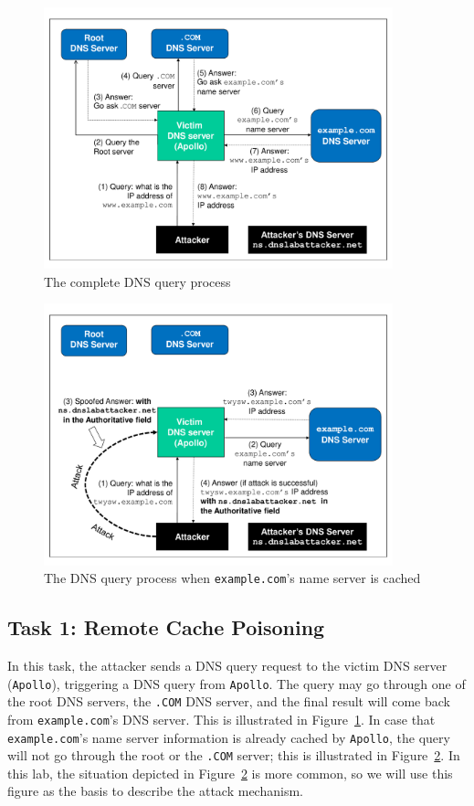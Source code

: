 \begin{figure}[H]
\centering
\includegraphics*[width=0.9\textwidth]{Figs/DNS_Remote_Flow1.pdf}
\caption{The complete DNS query process} 
\label{fig:flow_diagram1}
\end{figure}


\begin{figure}[H]
\centering
\includegraphics*[width=0.9\textwidth]{Figs/DNS_Remote_Flow2.pdf}
\caption{The DNS query process when {\tt example.com}'s name server is cached}
\label{fig:flow_diagram2}
\end{figure}


\subsection{Task 1: Remote Cache Poisoning}

In this task, the attacker sends a DNS query request to the victim
DNS server ({\tt Apollo}), triggering a DNS query from {\tt Apollo}. The
query may go through one of the root DNS servers, the {\tt .COM} DNS server, and 
the final result will come back from {\tt example.com}'s DNS server. This 
is illustrated in Figure~\ref{fig:flow_diagram1}. In case that 
{\tt example.com}'s name server information is already cached by 
{\tt Apollo}, the query will not go through the root or the 
{\tt .COM} server; this is illustrated in Figure~\ref{fig:flow_diagram2}.
In this lab, the situation depicted in  Figure~\ref{fig:flow_diagram2} is 
more common, so we will use this figure as the basis to describe 
the attack mechanism.


